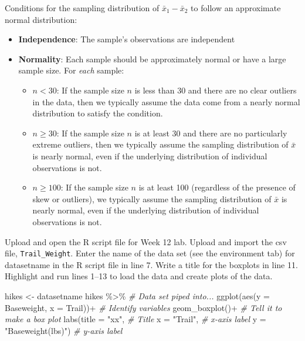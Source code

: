 \documentclass[
]{report}
\newenvironment{Shaded}{\begin{snugshade}}{\end{snugshade}}
\newcommand{\AttributeTok}[1]{\textcolor[rgb]{0.77,0.63,0.00}{#1}}
\newcommand{\CommentTok}[1]{\textcolor[rgb]{0.56,0.35,0.01}{\textit{#1}}}
\newcommand{\FunctionTok}[1]{\textcolor[rgb]{0.00,0.00,0.00}{#1}}
\newcommand{\NormalTok}[1]{#1}
\newcommand{\OtherTok}[1]{\textcolor[rgb]{0.56,0.35,0.01}{#1}}
\newcommand{\SpecialCharTok}[1]{\textcolor[rgb]{0.00,0.00,0.00}{#1}}
\newcommand{\StringTok}[1]{\textcolor[rgb]{0.31,0.60,0.02}{#1}}
\begin{document}
Conditions for the sampling distribution of \(\bar{x}_1-\bar{x}_2\) to follow an approximate normal distribution:

\begin{itemize}
\item
  \textbf{Independence}: The sample's observations are independent
\item
  \textbf{Normality}: Each sample should be approximately normal or have a large sample size. For \emph{each} sample:

  \begin{itemize}
  \item
    \(n < 30\): If the sample size \(n\) is less than 30 and there are no clear outliers in the data, then we typically assume the data come from a nearly normal distribution to satisfy the condition.
  \item
    \(n \ge 30\): If the sample size \(n\) is at least 30 and there are no particularly extreme outliers, then we typically assume the sampling distribution of \(\bar{x}\) is nearly normal, even if the underlying distribution of individual observations is not.
  \item
    \(n \geq 100\): If the sample size \(n\) is at least 100 (regardless of the presence of skew or outliers), we typically assume the sampling distribution of \(\bar{x}\) is nearly normal, even if the underlying distribution of individual observations is not.
  \end{itemize}
\end{itemize}

Upload and open the R script file for Week 12 lab. Upload and import the csv file, \texttt{Trail\_Weight}. Enter the name of the data set (see the environment tab) for datasetname in the R script file in line 7. Write a title for the boxplots in line 11. Highlight and run lines 1--13 to load the data and create plots of the data.

\begin{Shaded}
\begin{Highlighting}[]
\NormalTok{hikes }\OtherTok{\textless{}{-}}\NormalTok{ datasetname}
\NormalTok{hikes }\SpecialCharTok{\%\textgreater{}\%}  \CommentTok{\# Data set piped into...}
  \FunctionTok{ggplot}\NormalTok{(}\FunctionTok{aes}\NormalTok{(}\AttributeTok{y =}\NormalTok{ Baseweight, }\AttributeTok{x =}\NormalTok{ Trail))}\SpecialCharTok{+}  \CommentTok{\# Identify variables}
  \FunctionTok{geom\_boxplot}\NormalTok{()}\SpecialCharTok{+}  \CommentTok{\# Tell it to make a box plot}
  \FunctionTok{labs}\NormalTok{(}\AttributeTok{title =} \StringTok{"xx"}\NormalTok{,  }\CommentTok{\# Title}
       \AttributeTok{x =} \StringTok{"Trail"}\NormalTok{,    }\CommentTok{\# x{-}axis label}
       \AttributeTok{y =} \StringTok{"Baseweight(lbs)"}\NormalTok{)  }\CommentTok{\# y{-}axis label}
\end{Highlighting}
\end{Shaded}
\end{document}
